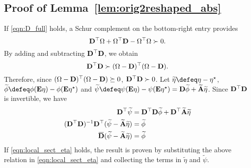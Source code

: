 \documentclass{ifacconf}
\begin{document}
\subsection{Proof of Lemma~\ref{lem:orig2reshaped_abs}} \label{sec:proof_lem1}
If \eqref{eqn:D_full} holds, a Schur complement on the bottom-right entry provides
\[
{\bf{D}}^\top \Omega +\Omega^\top {\bf{D}} -\Omega^\top\Omega\succ 0.
\]
By adding and subtracting ${\bf{D}}^\top {\bf{D}}$, we obtain
\[
{\bf{D}}^\top {\bf{D}}\succ (\Omega-{\bf{D}})^\top(\Omega-{\bf{D}}).
\]
Therefore, since $(\Omega-{\bf{D}})^\top(\Omega-{\bf{D}})\succeq 0$, ${\bf{D}}^\top {\bf{D}}\succ 0$. Let $\widetilde \eta \defeq \eta-\eta^\star$, $\widetilde \phi \defeq \phi(\bE\eta)-\phi(\bE\eta^\star)$ and $\widetilde \psi \defeq \psi(\bE\eta)-\psi(\bE\eta^\star) = \bD\widetilde \phi + \widetilde \bA\widetilde \eta $. Since ${\bf{D}}^\top {\bf{D}}$ is invertible, we have
\begin{align*}
    \bD^\top \widetilde \psi &= \bD^\top \bD \widetilde \phi + \bD^\top \widetilde \bA \widetilde \eta\\
      (\bD^\top \bD)^{-1}\bD^\top(\widetilde \psi - \widetilde \bA \widetilde \eta) &= \widetilde \phi \\
     \overbar \bD(\widetilde \psi - \widetilde \bA \widetilde \eta) &= \widetilde \phi 
\end{align*}
If \eqref{eqn:local_sect_eta} holds, the result is proven by substituting the above relation in \eqref{eqn:local_sect_eta} and collecting the terms in $\widetilde \eta$ and $\widetilde \psi$. 
\end{document}
